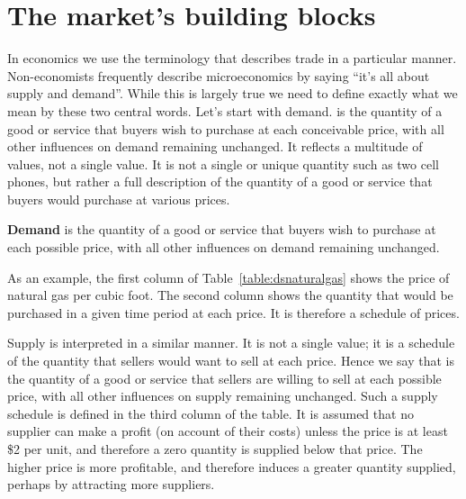 \section{The market's building blocks}\label{sec:ch3sec2}

In economics we use the terminology that describes trade in a particular manner. Non-economists frequently describe microeconomics by saying ``it's all about supply and demand''. While this is largely true we need to define exactly what we mean by these two central words. Let's start with demand.  is the quantity of a good or service that buyers wish to purchase at each conceivable price, with all other influences on demand remaining unchanged. It reflects a multitude of values, not a single value. It is not a single or unique quantity such as two cell phones, but rather a full description of the quantity of a good or service that buyers would purchase at various prices.

\begin{DefBox}
\textbf{Demand} is the quantity of a good or service that buyers wish to purchase at each possible price, with all other influences on demand remaining unchanged.
\end{DefBox}

As an example, the first column of Table~\ref{table:dsnaturalgas} shows the price of natural gas per cubic foot. The second column shows the quantity that would be purchased in a given time period at each price. It is therefore a schedule of prices.

Supply is interpreted in a similar manner. It is not a single value; it is a schedule of the quantity that sellers would want to sell at each price. Hence we say that  is the quantity of a good or service that sellers are willing to sell at each possible price, with all other influences on supply remaining unchanged. Such a supply schedule is defined in the third column of the table. It is assumed that no supplier can make a profit (on account of their costs) unless the price is at least \$2 per unit, and therefore a zero quantity is supplied below that price. The higher price is more profitable, and therefore induces a greater quantity supplied, perhaps by attracting more suppliers.

